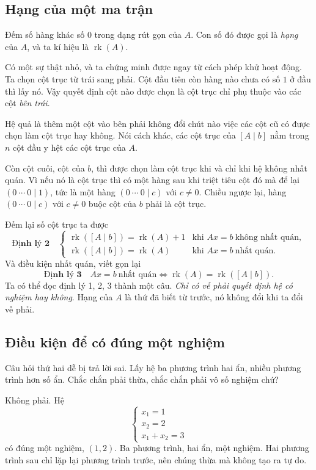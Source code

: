 \documentclass[12pt,a4paper]{article}
\begin{document}
\subsection{Hạng của một ma trận}

Đếm số hàng khác số \(0\) trong dạng rút gọn của \(A\). Con số đó được gọi là \emph{hạng} của \(A\), và ta kí hiệu là \(\operatorname{rk}(A)\).

Có một sự thật nhỏ, và ta chứng minh được ngay từ cách phép khử hoạt động. Ta chọn cột trục từ trái sang phải. Cột đầu tiên còn hàng nào chưa có số \(1\) ở đầu thì lấy nó. Vậy quyết định cột nào được chọn là cột trục chỉ phụ thuộc vào các cột \emph{bên trái}.

Hệ quả là thêm một cột vào bên phải không đổi chút nào việc các cột cũ có được chọn làm cột trục hay không. Nói cách khác, các cột trục của \([A\mid b]\) nằm trong \(n\) cột đầu y hệt các cột trục của \(A\).

Còn cột cuối, cột của \(b\), thì được chọn làm cột trục khi và chỉ khi hệ không nhất quán. Vì nếu nó là cột trục thì có một hàng sau khi triệt tiêu cột đó mà để lại \((0\ \cdots\ 0\mid 1)\), tức là một hàng \((0\ \cdots\ 0\mid c)\) với \(c\neq0\). Chiều ngược lại, hàng \((0\ \cdots\ 0\mid c)\) với \(c\neq0\) buộc cột của \(b\) phải là cột trục.

Đếm lại số cột trục ta được
$$
\textbf{Định lý 2}\quad
\begin{cases}
\operatorname{rk}([A\mid b])=\operatorname{rk}(A)+1 &\text{khi } Ax=b\ \text{không nhất quán},\\[2pt]
\operatorname{rk}([A\mid b])=\operatorname{rk}(A) &\text{khi } Ax=b\ \text{nhất quán}.
\end{cases}
$$
Và điều kiện nhất quán, viết gọn lại
$$
\textbf{Định lý 3}\quad Ax=b\ \text{nhất quán}\iff \operatorname{rk}(A)=\operatorname{rk}([A\mid b]).
$$
Ta có thể đọc định lý 1, 2, 3 thành một câu. \emph{Chỉ có vế phải quyết định hệ có nghiệm hay không}. Hạng của \(A\) là thứ đã biết từ trước, nó không đổi khi ta đổi vế phải.

\subsection{Điều kiện để có đúng một nghiệm}

Câu hỏi thứ hai dễ bị trả lời sai. Lấy hệ ba phương trình hai ẩn, nhiều phương trình hơn số ẩn. Chắc chắn phải thừa, chắc chắn phải vô số nghiệm chứ?

Không phải. Hệ
$$
\begin{cases}
x_1=1\\
x_2=2\\
x_1+x_2=3
\end{cases}
$$
có đúng một nghiệm, \((1,2)\). Ba phương trình, hai ẩn, một nghiệm. Hai phương trình sau chỉ lặp lại phương trình trước, nên chúng thừa mà không tạo ra tự do.
\end{document}
